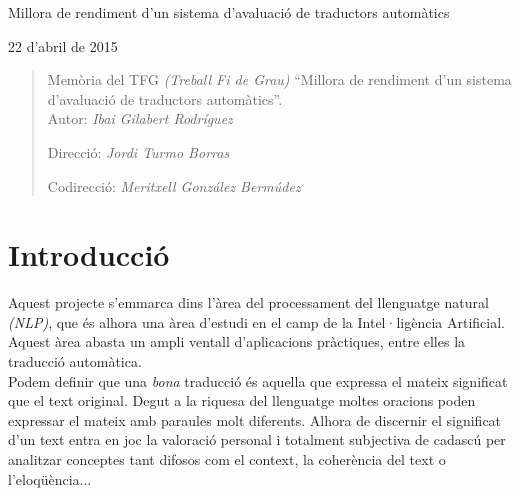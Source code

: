 \documentclass[11pt,a4paper]{article}
\begin{document}
\begin{titlepage}
    \begin{center}
        \vspace*{4cm}
        
        \LARGE
        Millora de rendiment d'un sistema d'avaluació de traductors automàtics
        
        \vspace{0.5cm}
        \large
        22 d'abril de 2015
        \vfill
        
    \end{center}
\end{titlepage}

\afterpage{\null\newpage}


\newpage
\begin{abstract}
Memòria del TFG \textit{(Treball Fi de Grau)} ``Millora de rendiment d'un sistema d'avaluació de traductors automàtics''.
\\

Autor: \textit{Ibai Gilabert Rodríguez}

Direcció: \textit{Jordi Turmo Borras}

Codirecció: \textit{Meritxell González Bermúdez}

\end{abstract}


\newpage
\tableofcontents
\newpage

\section{Introducció}

Aquest projecte s'emmarca dins l'àrea del processament del llenguatge natural \emph{(NLP)}, que és alhora una àrea d'estudi en el camp de la Intel·ligència Artificial. Aquest àrea abasta un ampli ventall d'aplicacions pràctiques, entre elles la traducció automàtica.
\\

Podem definir que una \emph{bona} traducció és aquella que expressa el mateix significat que el text original. Degut a la riquesa del llenguatge moltes oracions poden expressar el mateix amb paraules molt diferents. Alhora de discernir el significat d'un text entra en joc la valoració personal i totalment subjectiva de cadascú per analitzar conceptes tant difosos com el context, la coherència del text o l'eloqüència... 
\\
\end{document}
